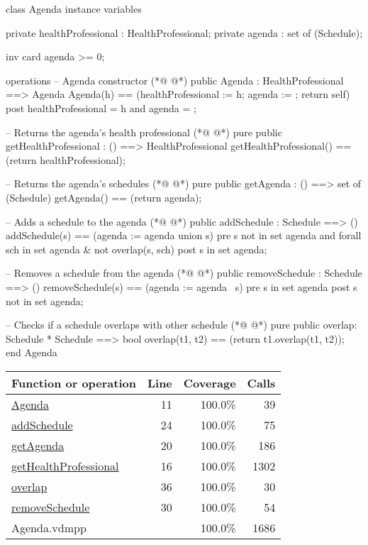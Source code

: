 \begin{vdmpp}[breaklines=true]
class Agenda
instance variables

private healthProfessional : HealthProfessional;
private agenda : set of (Schedule);

inv card agenda >= 0;

operations
 -- Agenda constructor
(*@
\label{Agenda:11}
@*)
 public Agenda : HealthProfessional ==> Agenda
  Agenda(h) == (healthProfessional := h; agenda := {}; return self)
 post healthProfessional = h and agenda = {};
 
 -- Returns the agenda's health professional
(*@
\label{getHealthProfessional:16}
@*)
 pure public getHealthProfessional : () ==> HealthProfessional
  getHealthProfessional() == (return healthProfessional);
 
 -- Returns the agenda's schedules
(*@
\label{getAgenda:20}
@*)
 pure public getAgenda : () ==> set of (Schedule)
  getAgenda() == (return agenda);
 
 -- Adds a schedule to the agenda
(*@
\label{addSchedule:24}
@*)
 public addSchedule : Schedule ==> ()
  addSchedule(s) == (agenda := agenda union {s})
 pre s not in set agenda and forall sch in set agenda & not overlap(s, sch)
 post s in set agenda;
 
 -- Removes a schedule from the agenda
(*@
\label{removeSchedule:30}
@*)
 public removeSchedule : Schedule ==> ()
  removeSchedule(s) == (agenda := agenda \ {s})
 pre s in set agenda
 post s not in set agenda;
 
 -- Checks if a schedule overlaps with other schedule
(*@
\label{overlap:36}
@*)
 pure public overlap: Schedule * Schedule ==> bool
  overlap(t1, t2) == (return t1.overlap(t1, t2));
end Agenda
\end{vdmpp}
\bigskip
\begin{longtable}{|l|r|r|r|}
\hline
Function or operation & Line & Coverage & Calls \\
\hline
\hline
\hyperref[Agenda:11]{Agenda} & 11&100.0\% & 39 \\
\hline
\hyperref[addSchedule:24]{addSchedule} & 24&100.0\% & 75 \\
\hline
\hyperref[getAgenda:20]{getAgenda} & 20&100.0\% & 186 \\
\hline
\hyperref[getHealthProfessional:16]{getHealthProfessional} & 16&100.0\% & 1302 \\
\hline
\hyperref[overlap:36]{overlap} & 36&100.0\% & 30 \\
\hline
\hyperref[removeSchedule:30]{removeSchedule} & 30&100.0\% & 54 \\
\hline
\hline
Agenda.vdmpp & & 100.0\% & 1686 \\
\hline
\end{longtable}

